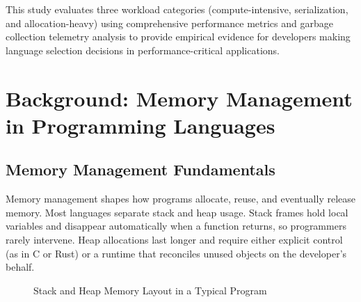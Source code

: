 \documentclass{article}
\begin{document}
This study evaluates three workload categories (compute-intensive, serialization, and allocation-heavy) using comprehensive performance metrics and garbage collection telemetry analysis to provide empirical evidence for developers making language selection decisions in performance-critical applications.

\section{Background: Memory Management in Programming Languages}

\subsection{Memory Management Fundamentals}

Memory management shapes how programs allocate, reuse, and eventually release memory. Most languages separate stack and heap usage. Stack frames hold local variables and disappear automatically when a function returns, so programmers rarely intervene. Heap allocations last longer and require either explicit control (as in C or Rust) or a runtime that reconciles unused objects on the developer's behalf.

\begin{figure}[h]
\centering
{}
\caption{Stack and Heap Memory Layout in a Typical Program }
\end{figure}
\end{document}

